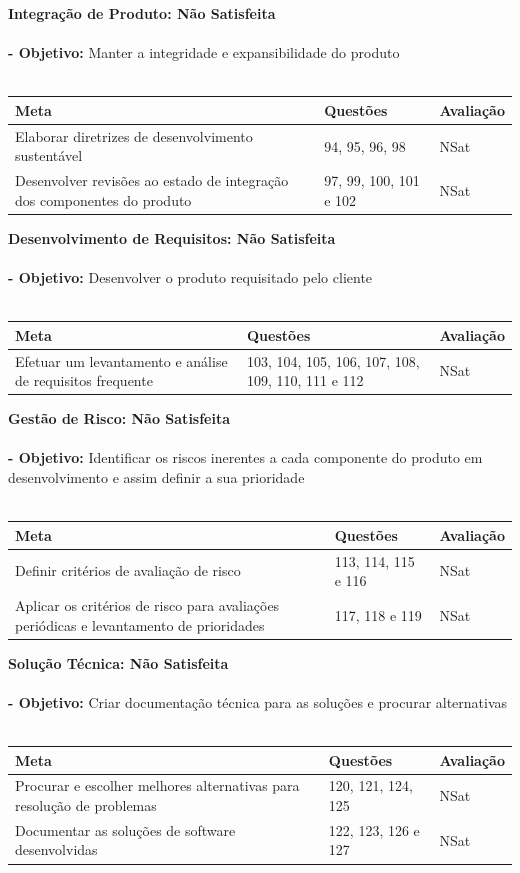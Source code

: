 \documentclass[openany,10pt,a4paper]{article}
\begin{document}
\textbf{Integração de Produto:  Não Satisfeita} \\  \\
\textbf{- Objetivo:} Manter a integridade e expansibilidade do produto \\
\\
\begin{tabular}{p{3in}|p{1.5in}|p{1.5in}}		
\textbf{Meta} & \textbf{Questões} & \textbf{Avaliação} \\ \hline
Elaborar diretrizes de desenvolvimento sustentável & 94, 95, 96, 98 & NSat \\
Desenvolver revisões ao estado de integração dos componentes do produto & 97, 99, 100, 101 e 102 & NSat \\ 
\end{tabular}

\textbf{Desenvolvimento de Requisitos: Não Satisfeita} \\  \\
\textbf{- Objetivo:} Desenvolver o produto requisitado pelo cliente \\
\\
\begin{tabular}{p{3in}|p{1.5in}|p{1.5in}}	
\textbf{Meta} & \textbf{Questões} & \textbf{Avaliação} \\ \hline
Efetuar um levantamento e análise de requisitos frequente & 103, 104, 105, 106, 107, 108, 109, 110, 111 e 112 & NSat \\
\end{tabular}

\textbf{Gestão de Risco: Não Satisfeita} \\  \\
\textbf{- Objetivo:} Identificar os riscos inerentes a cada componente do produto em desenvolvimento e assim definir a sua prioridade \\
\\
\begin{tabular}{p{3in}|p{1.5in}|p{1.5in}}		
\textbf{Meta} & \textbf{Questões} & \textbf{Avaliação} \\ \hline
Definir critérios de avaliação de risco & 113, 114, 115 e 116 & NSat \\
Aplicar os critérios de risco para avaliações periódicas e levantamento de prioridades & 117, 118 e 119 & NSat \\
\end{tabular}

\textbf{Solução Técnica: Não Satisfeita} \\  \\
\textbf{- Objetivo:} Criar documentação técnica para as soluções e procurar alternativas \\
\\
\begin{tabular}{p{3in}|p{1.5in}|p{1.5in}}		
\textbf{Meta} & \textbf{Questões} & \textbf{Avaliação} \\ \hline
Procurar e escolher melhores alternativas para resolução de problemas & 120, 121, 124, 125 & NSat \\
Documentar as soluções de software desenvolvidas & 122, 123, 126 e 127 & NSat \\
\end{tabular}
\end{document}
